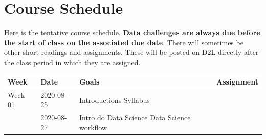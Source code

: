 \documentclass[
]{book}
\begin{document}
\hypertarget{course-schedule}{%
\section{Course Schedule}\label{course-schedule}}

Here is the tentative course schedule. \textbf{Data challenges are always due before the start of class on the associated due date}. There will sometimes be other short readings and assignments. These will be posted on D2L directly after the class period in which they are assigned.

\begin{longtable}[]{@{}llll@{}}
\toprule
\begin{minipage}[b]{0.22\columnwidth}\raggedright
Week\strut
\end{minipage} & \begin{minipage}[b]{0.22\columnwidth}\raggedright
Date\strut
\end{minipage} & \begin{minipage}[b]{0.22\columnwidth}\raggedright
Goals\strut
\end{minipage} & \begin{minipage}[b]{0.22\columnwidth}\raggedright
Assignment\strut
\end{minipage}\tabularnewline
\midrule
\endhead
\begin{minipage}[t]{0.22\columnwidth}\raggedright
Week 01\strut
\end{minipage} & \begin{minipage}[t]{0.22\columnwidth}\raggedright
2020-08-25\strut
\end{minipage} & \begin{minipage}[t]{0.22\columnwidth}\raggedright
Introductions Syllabus\strut
\end{minipage} & \begin{minipage}[t]{0.22\columnwidth}\raggedright
\strut
\end{minipage}\tabularnewline
\begin{minipage}[t]{0.22\columnwidth}\raggedright
\strut
\end{minipage} & \begin{minipage}[t]{0.22\columnwidth}\raggedright
2020-08-27\strut
\end{minipage} & \begin{minipage}[t]{0.22\columnwidth}\raggedright
Intro do Data Science Data Science workflow\strut
\end{minipage} & \begin{minipage}[t]{0.22\columnwidth}\raggedright

\end{minipage}
\end{longtable}
\end{document}
